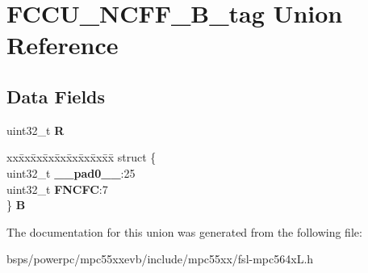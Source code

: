 \hypertarget{unionFCCU__NCFF__32B__tag}{}\section{F\+C\+C\+U\+\_\+\+N\+C\+F\+F\+\_\+B\+\_\+tag Union Reference}
\label{unionFCCU__NCFF__32B__tag}
\subsection*{Data Fields}
\begin{DoxyCompactItemize}
\item 
\mbox{\label{unionFCCU__NCFF__32B__tag_aad21f85ff79c265d320429bee65bfaa4}} 
uint32\+\_\+t {\bfseries R}
\item 
\mbox{\label{unionFCCU__NCFF__32B__tag_a9de8ac2d9af843016cf8135f92f56aff}} 
\begin{tabbing}
xx\=xx\=xx\=xx\=xx\=xx\=xx\=xx\=xx\=\kill
struct \{\\
\>uint32\_t {\bfseries \_\_pad0\_\_}:25\\
\>uint32\_t {\bfseries FNCFC}:7\\
\} {\bfseries B}\\

\end{tabbing}\end{DoxyCompactItemize}


The documentation for this union was generated from the following file\+:\begin{DoxyCompactItemize}
\item 
bsps/powerpc/mpc55xxevb/include/mpc55xx/fsl-\/mpc564x\+L.\+h\end{DoxyCompactItemize}
